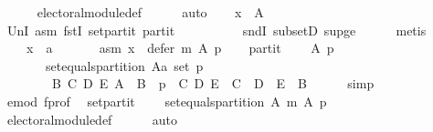 \begin{isabellebody}
\ \ \ \ \isamarkupfalse%
\ electoral{\isacharunderscore}{\kern0pt}module{\isacharunderscore}{\kern0pt}def\isanewline
\ \ \ \ \isamarkupfalse%
\ auto\isanewline
\ \ \isamarkupfalse%
\ {\isachardoublequoteopen}x\ {\isasymin}\ A{\isachardoublequoteclose}\isanewline
\ \ \ \ \isamarkupfalse%
\ UnI{}\ asm\ fstI\ set{\isacharunderscore}{\kern0pt}partit\ partit\isanewline
\ \ \ \ \ \ \ \ \ \ sndI\ subsetD\ sup{\isacharunderscore}{\kern0pt}ge{}\isanewline
\ \ \ \ \isamarkupfalse%
\ metis\isanewline
{}\isamarkupfalse%
\isanewline
\ \ \isamarkupfalse%
\isanewline
\ \ \ \ x\ {\isacharcolon}{\kern0pt}{\isacharcolon}{\kern0pt}\ {\isachardoublequoteopen}{\isacharprime}{\kern0pt}a{\isachardoublequoteclose}\isanewline
\ \ \isamarkupfalse%
\isanewline
\ \ \ \ asm{\isacharcolon}{\kern0pt}\ {\isachardoublequoteopen}x\ {\isasymin}\ defer\ m\ A\ p{\isachardoublequoteclose}\isanewline
\ \ \isamarkupfalse%
\ partit{\isacharcolon}{\kern0pt}\isanewline
\ \ \ \ {\isachardoublequoteopen}{\isasymforall}A\ p{\isachardot}{\kern0pt}\isanewline
\ \ \ \ \ \ {\isasymnot}\ set{\isacharunderscore}{\kern0pt}equals{\isacharunderscore}{\kern0pt}partition\ {\isacharparenleft}{\kern0pt}A{\isacharcolon}{\kern0pt}{\isacharcolon}{\kern0pt}{\isacharprime}{\kern0pt}a\ set{\isacharparenright}{\kern0pt}\ p\ {\isasymor}\isanewline
\ \ \ \ \ \ \ \ {\isacharparenleft}{\kern0pt}{\isasymexists}B\ C\ D\ E{\isachardot}{\kern0pt}\ A\ {\isacharequal}{\kern0pt}\ B\ {\isasymand}\ p\ {\isacharequal}{\kern0pt}\ {\isacharparenleft}{\kern0pt}C{\isacharcomma}{\kern0pt}\ D{\isacharcomma}{\kern0pt}\ E{\isacharparenright}{\kern0pt}\ {\isasymand}\ C\ {\isasymunion}\ D\ {\isasymunion}\ E\ {\isacharequal}{\kern0pt}\ B{\isacharparenright}{\kern0pt}{\isachardoublequoteclose}\isanewline
\ \ \ \ \isamarkupfalse%
\ simp\isanewline
\ \ \isamarkupfalse%
\ e{\isacharunderscore}{\kern0pt}mod\ f{\isacharunderscore}{\kern0pt}prof\ \isamarkupfalse%
\ set{\isacharunderscore}{\kern0pt}partit{\isacharcolon}{\kern0pt}\isanewline
\ \ \ \ {\isachardoublequoteopen}set{\isacharunderscore}{\kern0pt}equals{\isacharunderscore}{\kern0pt}partition\ A\ {\isacharparenleft}{\kern0pt}m\ A\ p{\isacharparenright}{\kern0pt}{\isachardoublequoteclose}\isanewline
\ \ \ \ \isamarkupfalse%
\ electoral{\isacharunderscore}{\kern0pt}module{\isacharunderscore}{\kern0pt}def\isanewline
\ \ \ \ \isamarkupfalse%
\ auto\isanewline

\end{isabellebody}
